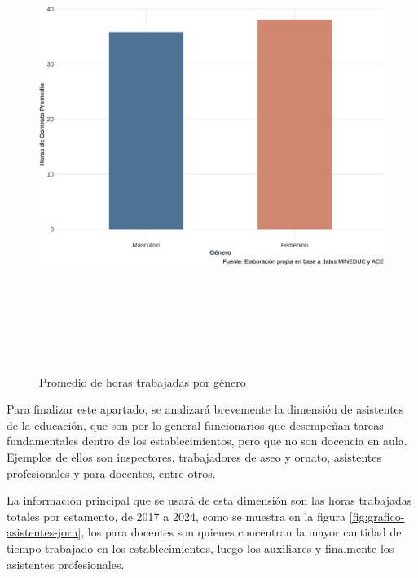 \documentclass[
  12pt,
  letterpaper,
]{article}
\begin{document}
\begin{figure}

{\centering \includegraphics[width=0.8\linewidth,height=6in]{tesis_ver_final_files/figure-latex/grafico-genero-horas-1} 

}

\caption{Promedio de horas trabajadas por género}\label{fig:grafico-genero-horas}
\end{figure}

Para finalizar este apartado, se analizará brevemente la dimensión de asistentes de la educación, que son por lo general funcionarios que desempeñan tareas fundamentales dentro de los establecimientos, pero que no son docencia en aula.
Ejemplos de ellos son inspectores, trabajadores de aseo y ornato, asistentes profesionales y para docentes, entre otros.

La información principal que se usará de esta dimensión son las horas trabajadas totales por estamento, de 2017 a 2024, como se muestra en la figura \ref{fig:grafico-asistentes-jorn}, los para docentes son quienes concentran la mayor cantidad de tiempo trabajado en los establecimientos, luego los auxiliares y finalmente los asistentes profesionales.
\end{document}
